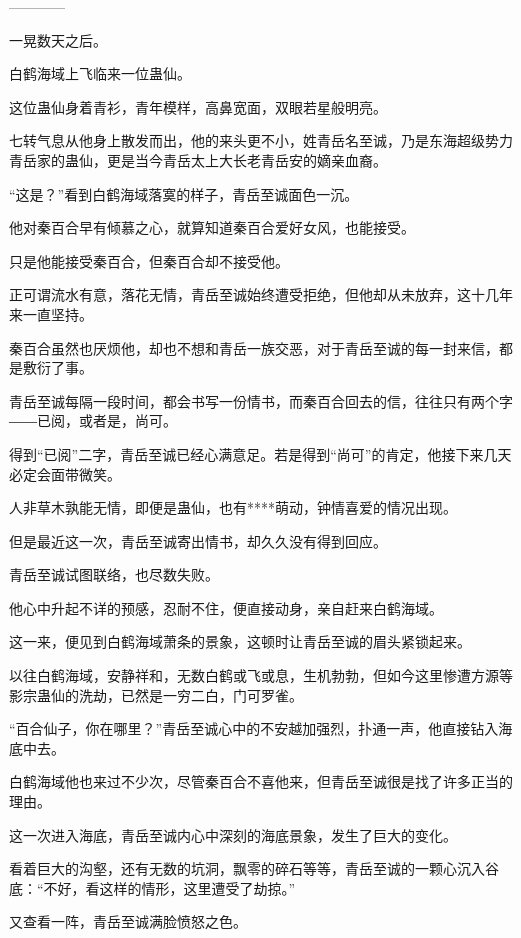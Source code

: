 
\begin{this_body}

------------

一晃数天之后。

白鹤海域上飞临来一位蛊仙。

这位蛊仙身着青衫，青年模样，高鼻宽面，双眼若星般明亮。

七转气息从他身上散发而出，他的来头更不小，姓青岳名至诚，乃是东海超级势力青岳家的蛊仙，更是当今青岳太上大长老青岳安的嫡亲血裔。

“这是？”看到白鹤海域落寞的样子，青岳至诚面色一沉。

他对秦百合早有倾慕之心，就算知道秦百合爱好女风，也能接受。

只是他能接受秦百合，但秦百合却不接受他。

正可谓流水有意，落花无情，青岳至诚始终遭受拒绝，但他却从未放弃，这十几年来一直坚持。

秦百合虽然也厌烦他，却也不想和青岳一族交恶，对于青岳至诚的每一封来信，都是敷衍了事。

青岳至诚每隔一段时间，都会书写一份情书，而秦百合回去的信，往往只有两个字――已阅，或者是，尚可。

得到“已阅”二字，青岳至诚已经心满意足。若是得到“尚可”的肯定，他接下来几天必定会面带微笑。

人非草木孰能无情，即便是蛊仙，也有****萌动，钟情喜爱的情况出现。

但是最近这一次，青岳至诚寄出情书，却久久没有得到回应。

青岳至诚试图联络，也尽数失败。

他心中升起不详的预感，忍耐不住，便直接动身，亲自赶来白鹤海域。

这一来，便见到白鹤海域萧条的景象，这顿时让青岳至诚的眉头紧锁起来。

以往白鹤海域，安静祥和，无数白鹤或飞或息，生机勃勃，但如今这里惨遭方源等影宗蛊仙的洗劫，已然是一穷二白，门可罗雀。

“百合仙子，你在哪里？”青岳至诚心中的不安越加强烈，扑通一声，他直接钻入海底中去。

白鹤海域他也来过不少次，尽管秦百合不喜他来，但青岳至诚很是找了许多正当的理由。

这一次进入海底，青岳至诚内心中深刻的海底景象，发生了巨大的变化。

看着巨大的沟壑，还有无数的坑洞，飘零的碎石等等，青岳至诚的一颗心沉入谷底：“不好，看这样的情形，这里遭受了劫掠。”

又查看一阵，青岳至诚满脸愤怒之色。


\end{this_body}
